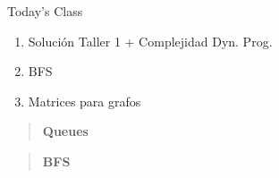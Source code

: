\begin{frame}{Today's Class}
	\begin{enumerate}
		\item Solución Taller 1 + Complejidad Dyn. Prog.
		\item BFS
		\item Matrices para grafos
	\end{enumerate}
\end{frame}
%
\begin{frame}
	\begin{quote}
		\textbf{\Large Queues}
	\end{quote}
\end{frame}
%
\begin{frame}
	
	
	
	
	
	
\end{frame}
%
\begin{frame}
	\begin{quote}
		\textbf{\Large BFS}
	\end{quote}
\end{frame}
%
\begin{frame}
	
\end{frame}
%
\begin{frame}
	
\end{frame}
%
